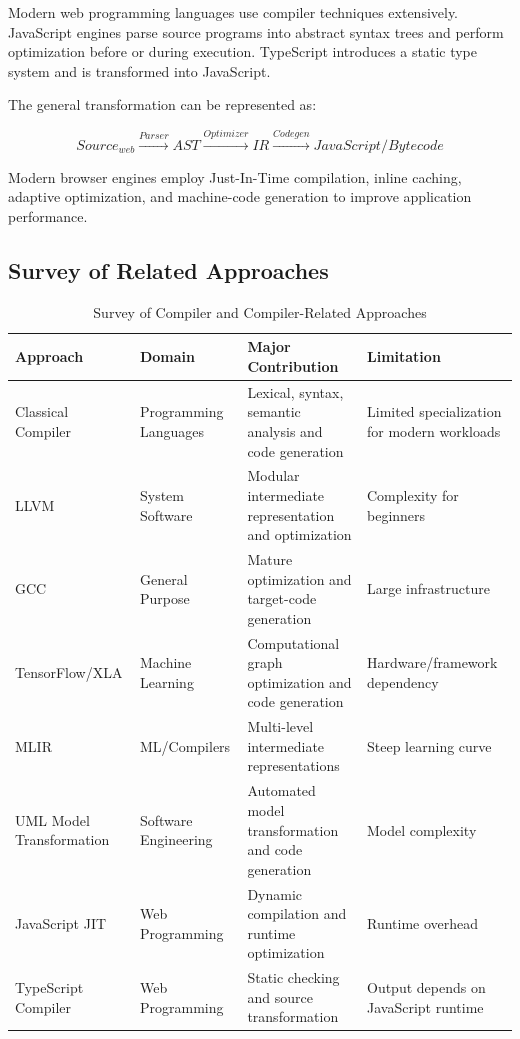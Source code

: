 \documentclass[12pt,a4paper]{article}
\begin{document}
Modern web programming languages use compiler techniques extensively.
JavaScript engines parse source programs into abstract syntax trees and
perform optimization before or during execution. TypeScript introduces a
static type system and is transformed into JavaScript.

The general transformation can be represented as:

\begin{equation}
Source_{web}
\xrightarrow{Parser}
AST
\xrightarrow{Optimizer}
IR
\xrightarrow{Codegen}
JavaScript/Bytecode
\end{equation}

Modern browser engines employ Just-In-Time compilation, inline caching,
adaptive optimization, and machine-code generation to improve application
performance.

\subsection{Survey of Related Approaches}

\begin{table}[H]
\centering
\caption{Survey of Compiler and Compiler-Related Approaches}
\label{tab:survey}
\small
\begin{tabularx}{\textwidth}{p{2.2cm}p{2.4cm}X p{2.0cm}}
\toprule
\textbf{Approach} & \textbf{Domain} & \textbf{Major Contribution} &
\textbf{Limitation}\\
\midrule

Classical Compiler
& Programming Languages
& Lexical, syntax, semantic analysis and code generation
& Limited specialization for modern workloads\\

LLVM
& System Software
& Modular intermediate representation and optimization
& Complexity for beginners\\

GCC
& General Purpose
& Mature optimization and target-code generation
& Large infrastructure\\

TensorFlow/XLA
& Machine Learning
& Computational graph optimization and code generation
& Hardware/framework dependency\\

MLIR
& ML/Compilers
& Multi-level intermediate representations
& Steep learning curve\\

UML Model Transformation
& Software Engineering
& Automated model transformation and code generation
& Model complexity\\

JavaScript JIT
& Web Programming
& Dynamic compilation and runtime optimization
& Runtime overhead\\

TypeScript Compiler
& Web Programming
& Static checking and source transformation
& Output depends on JavaScript runtime\\

\bottomrule
\end{tabularx}
\end{table}
\end{document}
